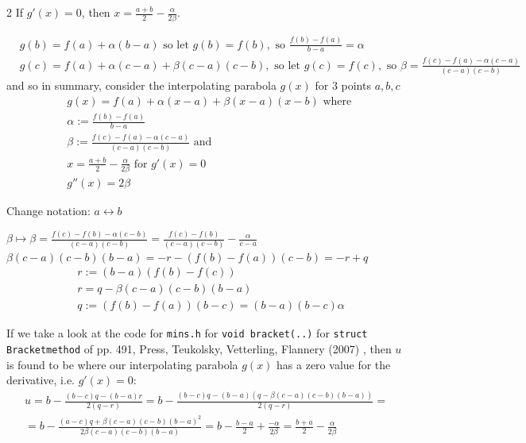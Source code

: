\documentclass[10pt]{amsart}
\begin{document}
\begin{multicols*}{2}
If $g'(x) = 0$, then $x = \frac{a+b}{2} - \frac{\alpha}{2\beta}$.

\[
\begin{aligned}
& g(b) = f(a) + \alpha (b-a) \text{ so let } g(b) = f(b), \text{ so } \frac{f(b) - f(a)}{b-a} = \alpha \\
& g(c) = f(a) + \alpha(c-a) + \beta(c-a)(c-b), \text{ so let } g(c) = f(c), \text{ so } \beta = \frac{f(c) - f(a) - \alpha(c-a) }{(c-a)(c-b)}
\end{aligned}
\]
and so in summary, consider the interpolating parabola $g(x)$ for 3 points $a,b,c$
\begin{equation}\label{Eq:ParabolicInterpolation}
\boxed{
\begin{aligned}
& g(x) = f(a) + \alpha (x-a) + \beta(x-a) (x-b) \text{ where } \\
& \alpha := \frac{ f(b) - f(a) }{b-a} \\
& \beta := \frac{ f(c) - f(a) - \alpha (c-a) }{ (c-a)(c-b)} \text{ and } \\
& x = \frac{ a + b}{2} - \frac{\alpha}{2 \beta} \text{ for } g'(x) = 0  \\
& g''(x) = 2\beta
\end{aligned}
}
\end{equation}

Change notation: $a \leftrightarrow b$

$\beta \mapsto \beta = \frac{f(c) - f(b) - \alpha (c-b) }{(c-a)(c-b) } = \frac{f(c) - f(b)}{(c-a)(c-b)} - \frac{\alpha}{c-a}$  \\
$\beta ( c-a)(c-b) (b-a) = -r - (f(b) - f(a))(c-b) = -r +q$  \\
\[
\begin{aligned}
& r := (b-a)(f(b)- f(c)) \\
& r = q - \beta(c-a)(c-b)(b-a) \\
& q:= (f(b) - f(a))(b-c) = (b-a)(b-c) \alpha
\end{aligned}
\]

If we take a look at the code for \verb|mins.h| for \verb|void bracket(..)| for \verb|struct Bracketmethod| of pp. 491, Press, Teukolsky, Vetterling, Flannery (2007) \cite{PTVF2007}, then $u$ is found to be where our interpolating parabola $g(x)$ has a zero value for the derivative, i.e. $g'(x) = 0$:
\[
\begin{gathered}
u = b - \frac{ (b-c)q - (b-a) r }{ 2 (q-r) } = b - \frac{ (b-c) q - (b-a)(q- \beta(c-a) (c-b)(b-a) ) }{ 2(q-r) } = \\
= b - \frac{(a-c)q + \beta(c-a)(c-b)(b-a)^2 }{2\beta(c-a)(c-b)(b-a) } = b-  \frac{b-a}{2} + \frac{-\alpha}{2\beta} = \frac{b+a}{2} - \frac{\alpha}{2\beta}
\end{gathered}
\]


\end{multicols*}
\end{document}
